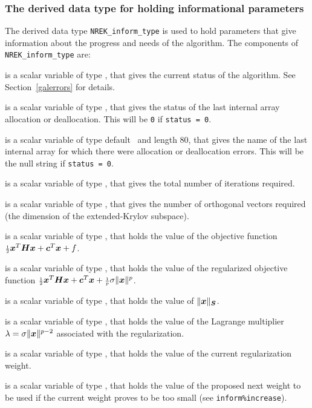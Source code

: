 \documentclass{galahad}
\newcommand{\packagename}{NREK}
\begin{document}

\subsubsection{The derived data type for holding informational
 parameters}\label{typeinform}
The derived data type
{\tt \packagename\_inform\_type}
is used to hold parameters that give information about the progress and needs
of the algorithm. The components of
{\tt \packagename\_inform\_type}
are:

\begin{description}
 is a scalar variable of type \integer, that gives the
current status of the algorithm. See Section~\ref{galerrors} for details.

 is a scalar variable of type \integer,
that gives the status of the last internal array allocation
or deallocation. This will be {\tt 0} if {\tt status = 0}.

 is a scalar variable of type default \character\
and length 80, that  gives the name of the last internal array
for which there were allocation or deallocation errors.
This will be the null string if {\tt status = 0}.

 is a scalar variable of type \integer, that gives the
total number of iterations required.

 is a scalar variable of type \integer, that gives the
number of orthogonal vectors required (the dimension of the extended-Krylov
subspace).

 is a scalar variable of type \realdp, that holds the
value of the objective function ${\scriptstyle \frac{1}{2}} {\bm{x}}^T {\bm{H}} {\bm{x}}  +  {\bm{c}}^T {\bm{x}} + f$.

 is a scalar variable of type \realdp, that holds the
value of the regularized objective function 
${\scriptstyle \frac{1}{2}} {\bm{x}}^T {\bm{H}} {\bm{x}}  + {\bm{c}}^T {\bm{x}} + {\scriptstyle \frac{1}{p}}\sigma \|{\bm{x}}\|^p$.

 is a scalar variable of type \realdp,
that holds the value of $\|{\bm{x}}\|_{{\bm{S}}}$.

 is a scalar variable of type \realdp, that holds the
value of the Lagrange multiplier $\lambda = \sigma \|{\bm{x}}\|^{p-2}$
associated with the regularization.

 is a scalar variable of type \realdp, that holds the value of
the current regularization weight.

 is a scalar variable of type \realdp, that holds the value 
of the proposed next weight to be used if the current weight proves to be
too small (see {\tt inform\%increase}).


\end{description}
\end{document}
